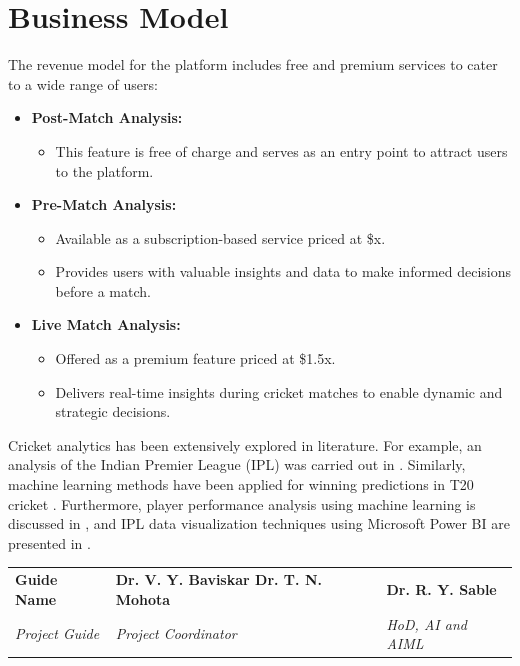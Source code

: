 \section{Business Model}
The revenue model for the platform includes free and premium services to cater to a wide range of users:
\begin{itemize}
    \item \textbf{Post-Match Analysis:} 
    \begin{itemize}
        \item This feature is free of charge and serves as an entry point to attract users to the platform.
    \end{itemize}
    \item \textbf{Pre-Match Analysis:}
    \begin{itemize}
        \item Available as a subscription-based service priced at \$x.
        \item Provides users with valuable insights and data to make informed decisions before a match.
    \end{itemize}
    \item \textbf{Live Match Analysis:}
    \begin{itemize}
        \item Offered as a premium feature priced at \$1.5x.
        \item Delivers real-time insights during cricket matches to enable dynamic and strategic decisions.
    \end{itemize}
\end{itemize}

	
	
	
	


Cricket analytics has been extensively explored in literature. For example, an analysis of the Indian Premier League (IPL) was carried out in \cite{ipl_analysis_prediction}. 
Similarly, machine learning methods have been applied for winning predictions in T20 cricket \cite{t20_prediction}.
Furthermore, player performance analysis using machine learning is discussed in \cite{player_performance_analysis}, 
and IPL data visualization techniques using Microsoft Power BI are presented in \cite{ipl_visualization}.




\vfill %

\begin{center}
\begin{tabular}{>{\centering\arraybackslash}m{}  %
                >{\centering\arraybackslash}m{}  %
                >{\centering\arraybackslash}m{}} %
    \textbf{Guide Name} & \textbf{Dr. V. Y. Baviskar Dr. T. N. Mohota} & \textbf{Dr. R. Y. Sable} \\ 
    \textit{Project Guide} & \textit{Project Coordinator} & \textit{HoD, AI and AIML} \\
\end{tabular}
\end{center}

